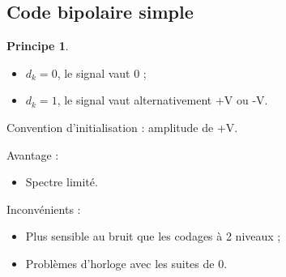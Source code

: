 \documentclass[11pt,english,french]{scrreprt}
\theoremstyle{remark}
\theoremstyle{definition}
\newtheorem*{princ*}{Principe}
\begin{document}
\subsection{Code bipolaire simple} %
\begin{princ*}\hfill
	\begin{itemize}
		\item $d_k=0$, le signal vaut 0 ;
		\item $d_k = 1$, le signal vaut alternativement +V ou -V.
	\end{itemize}
\end{princ*}

Convention d'initialisation : amplitude de +V.

Avantage :\begin{itemize}
	\item Spectre limité.
\end{itemize}
	          
Inconvénients :\begin{itemize}
	\item Plus sensible au bruit que les codages à 2 niveaux ;
	\item Problèmes d'horloge avec les suites de 0.
\end{itemize}
\end{document}
